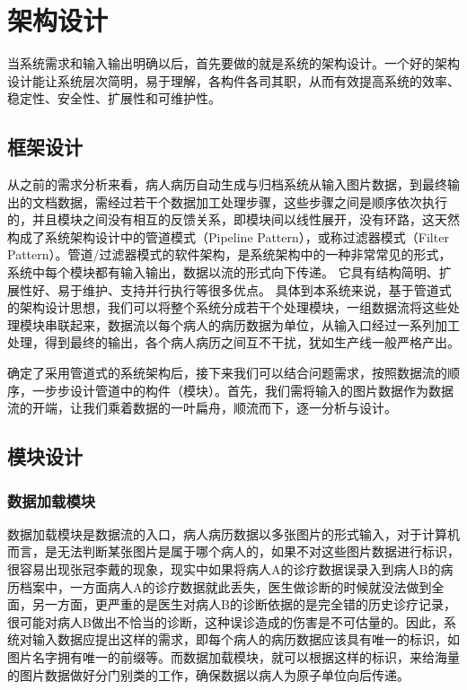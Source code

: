 \chapter{架构设计}
\label{chap:system-framework}
当系统需求和输入输出明确以后，首先要做的就是系统的架构设计。一个好的架构设计能让系统层次简明，易于理解，各构件各司其职，从而有效提高系统的效率、稳定性、安全性、扩展性和可维护性。

\section{框架设计}
从之前的需求分析来看，病人病历自动生成与归档系统从输入图片数据，到最终输出的文档数据，需经过若干个数据加工处理步骤，这些步骤之间是顺序依次执行的，并且模块之间没有相互的反馈关系，即模块间以线性展开，没有环路，这天然构成了系统架构设计中的管道模式（Pipeline Pattern）\citep{Vermeulen1995pipeline}，或称过滤器模式（Filter Pattern）。管道/过滤器模式的软件架构，是系统架构中的一种非常常见的形式，系统中每个模块都有输入输出，数据以流的形式向下传递。
它具有结构简明、扩展性好、易于维护、支持并行执行等很多优点。
具体到本系统来说，基于管道式的架构设计思想，我们可以将整个系统分成若干个处理模块，一组数据流将这些处理模块串联起来，数据流以每个病人的病历数据为单位，从输入口经过一系列加工处理，得到最终的输出，各个病人病历之间互不干扰，犹如生产线一般严格产出。

确定了采用管道式的系统架构后，接下来我们可以结合问题需求，按照数据流的顺序，一步步设计管道中的构件（模块）。首先，我们需将输入的图片数据作为数据流的开端，让我们乘着数据的一叶扁舟，顺流而下，逐一分析与设计。

\section{模块设计}
\subsection{数据加载模块} \label{ssec:dataLoader-design}
数据加载模块是数据流的入口，病人病历数据以多张图片的形式输入，对于计算机而言，是无法判断某张图片是属于哪个病人的，如果不对这些图片数据进行标识，很容易出现张冠李戴的现象，现实中如果将病人A的诊疗数据误录入到病人B的病历档案中，一方面病人A的诊疗数据就此丢失，医生做诊断的时候就没法做到全面，另一方面，更严重的是医生对病人B的诊断依据的是完全错的历史诊疗记录，很可能对病人B做出不恰当的诊断，这种误诊造成的伤害是不可估量的。因此，系统对输入数据应提出这样的需求，即每个病人的病历数据应该具有唯一的标识，如图片名字拥有唯一的前缀等。而数据加载模块，就可以根据这样的标识，来给海量的图片数据做好分门别类的工作，确保数据以病人为原子单位向后传递。

